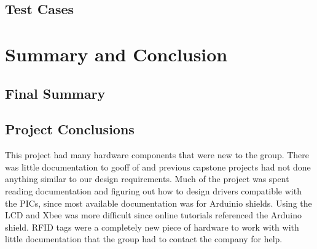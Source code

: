 \documentclass[12pt]{article} %
\begin{document}
\begin{itemize}
\begin{itemize}
\begin{itemize}
\begin{itemize}
\begin{itemize}
\subsection{Test Cases} %
%




\section{Summary and Conclusion}
%

\subsection{Final Summary}


\subsection{Project Conclusions} %

This project had many hardware components that were new to the group. There was little documentation to gooff of and previous capstone projects had not done anything similar to our design requirements. Much of the project was spent
reading documentation and figuring out how to design drivers compatible with the PICs, since most available documentation was
for Arduinio shields. Using the LCD and Xbee was more difficult since online tutorials referenced the Arduino shield. RFID tags
were a completely new piece of hardware to work with with little documentation that the group had to contact the company for help.


\end{itemize}
\end{itemize}
\end{itemize}
\end{itemize}
\end{itemize}
\end{document}
